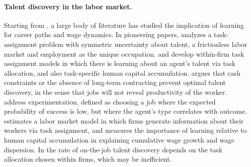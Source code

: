 \documentclass[12pt,american]{paper}
\theoremstyle{remark}
\begin{document}

\paragraph{Talent discovery in the labor market.} Starting from \cite{jovanovic1979job}, a large body of literature has studied the implication of learning for career paths and wage dynamics. 
In pioneering papers, \citet{macdonald1982information,macdonald1982market} analyzes a task-assignment problem with symmetric uncertainty about talent, a frictionless labor market and employment as the unique occupation. \citet{gibbons1999theory} and \citet{gibbons2004task} develop within-firm task assignment models in which there is learning about an agent's talent via task allocation, and also task-specific human capital accumulation. \citet{tervio_superstars_2009} argues that cash constraints or the absence of long-term contracting prevent optimal talent discovery, in the sense that jobs will not reveal productivity of the worker. \citet*{antonovics_experimentation_2010} address experimentation, defined as choosing a job where the expected probability of success is low, but where the agent's type correlates with outcome.  \citet{pastorino2013careers} estimates a labor market model in which firms generate information about their workers via task assignment, and measures the importance of learning relative to human capital accumulation in explaining cumulative wage growth and wage dispersion.  In \cite{canidio2013rewarding} the rate of on-the-job talent discovery depends on the task allocation chosen within firms, which may be inefficient. 


\end{document}
